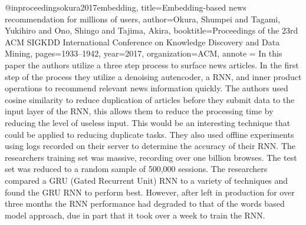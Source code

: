 @inproceedings{okura2017embedding,
  title={Embedding-based news recommendation for millions of users},
  author={Okura, Shumpei and Tagami, Yukihiro and Ono, Shingo and Tajima, Akira},
  booktitle={Proceedings of the 23rd ACM SIGKDD International Conference on Knowledge Discovery and Data Mining},
  pages={1933--1942},
  year={2017},
  organization={ACM},
  annote = {In this paper the authors utilize a three step process to surface news articles. In the first step of the process they utilize a denoising autencoder, a RNN, and inner product operations to recommend relevant news information quickly.
    The authors used cosine similarity to reduce duplication of articles before they submit data to the input layer of the RNN, this allows them to reduce the processing time by reducing the level of useless input. This would be an interesting technique that could be applied to reducing duplicate tasks.
    They also used offline experiments using logs recorded on their server to determine the accuracy of their RNN. The researchers training set was massive, recording over one billion browses. The test set was reduced to a random sample of 500,000 sessions.
    The researchers compared a GRU (Gated Recurrent Unit) RNN to a variety of techniques and found the GRU RNN to perform best. However, after left in production for over three months the RNN performance had degraded to that of the words based model approach, due in part 
    that it took over a week to train the RNN.
  }
}

